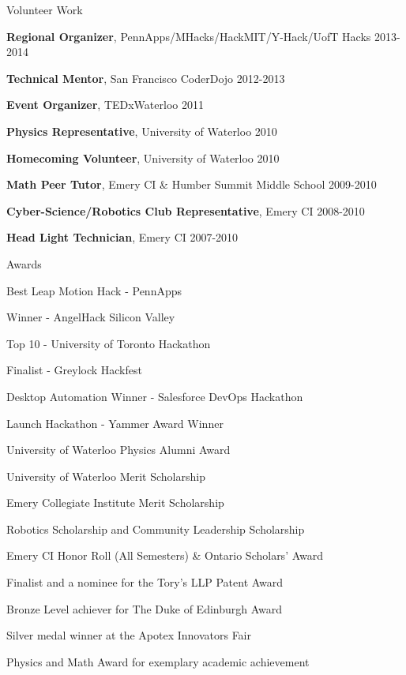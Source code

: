 \documentclass[oneside]{resume}
\begin{document}
  \begin{rSection}{Volunteer Work}

    \begin{rSubListing}
      \item {{\bfseries Regional Organizer}, PennApps/MHacks/HackMIT/Y-Hack/UofT Hacks \hfill 2013-2014}
      \item {{\bfseries Technical Mentor}, San Francisco CoderDojo \hfill 2012-2013}
      \item {{\bfseries Event Organizer}, TEDxWaterloo \hfill 2011}
      \item {{\bfseries Physics Representative}, University of Waterloo \hfill 2010}
      \item {{\bfseries Homecoming Volunteer}, University of Waterloo \hfill 2010}
      \item {{\bfseries Math Peer Tutor}, Emery CI \& Humber Summit Middle School \hfill 2009-2010}
      \item {{\bfseries Cyber-Science/Robotics Club Representative}, Emery CI \hfill 2008-2010}
      \item {{\bfseries Head Light Technician}, Emery CI \hfill 2007-2010}
    \end{rSubListing}

  \end{rSection}


  \begin{rSection}{Awards}

    \begin{rSubListing}
      \item Best Leap Motion Hack - PennApps
      \item Winner - AngelHack Silicon Valley
      \item Top 10 - University of Toronto Hackathon
      \item Finalist - Greylock Hackfest
      \item Desktop Automation Winner - Salesforce DevOps Hackathon
      \item Launch Hackathon - Yammer Award Winner
      \item University of Waterloo Physics Alumni Award
      \item University of Waterloo Merit Scholarship
      \item Emery Collegiate Institute Merit Scholarship
      \item Robotics Scholarship and Community Leadership Scholarship
      \item Emery CI Honor Roll (All Semesters) \& Ontario Scholars’ Award
      \item Finalist and a nominee for the Tory’s LLP Patent Award
      \item Bronze Level achiever for The Duke of Edinburgh Award
      \item Silver medal winner at the Apotex Innovators Fair
      \item Physics and Math Award for exemplary academic achievement
    \end{rSubListing}

  \end{rSection}
\end{document}
